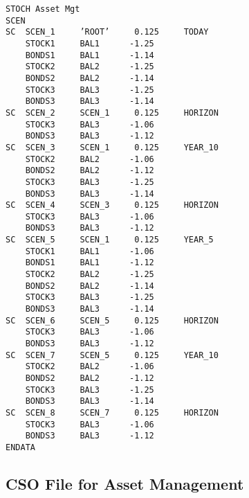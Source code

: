 \documentclass[final,1p,times]{elsarticle}
\begin{document}
\begin{Verbatim}[frame=single,label=asset\_management.sto]
STOCH Asset Mgt
SCEN
SC  SCEN_1     ’ROOT’     0.125     TODAY
    STOCK1     BAL1      -1.25
    BONDS1     BAL1      -1.14
    STOCK2     BAL2      -1.25
    BONDS2     BAL2      -1.14
    STOCK3     BAL3      -1.25
    BONDS3     BAL3      -1.14
SC  SCEN_2     SCEN_1     0.125     HORIZON
    STOCK3     BAL3      -1.06
    BONDS3     BAL3      -1.12
SC  SCEN_3     SCEN_1     0.125     YEAR_10
    STOCK2     BAL2      -1.06
    BONDS2     BAL2      -1.12
    STOCK3     BAL3      -1.25
    BONDS3     BAL3      -1.14
SC  SCEN_4     SCEN_3     0.125     HORIZON
    STOCK3     BAL3      -1.06
    BONDS3     BAL3      -1.12
SC  SCEN_5     SCEN_1     0.125     YEAR_5
    STOCK1     BAL1      -1.06
    BONDS1     BAL1      -1.12
    STOCK2     BAL2      -1.25
    BONDS2     BAL2      -1.14
    STOCK3     BAL3      -1.25
    BONDS3     BAL3      -1.14
SC  SCEN_6     SCEN_5     0.125     HORIZON
    STOCK3     BAL3      -1.06
    BONDS3     BAL3      -1.12
SC  SCEN_7     SCEN_5     0.125     YEAR_10
    STOCK2     BAL2      -1.06
    BONDS2     BAL2      -1.12
    STOCK3     BAL3      -1.25
    BONDS3     BAL3      -1.14
SC  SCEN_8     SCEN_7     0.125     HORIZON
    STOCK3     BAL3      -1.06
    BONDS3     BAL3      -1.12
ENDATA
\end{Verbatim}

\subsection*{CSO File for Asset Management}
\end{document}
